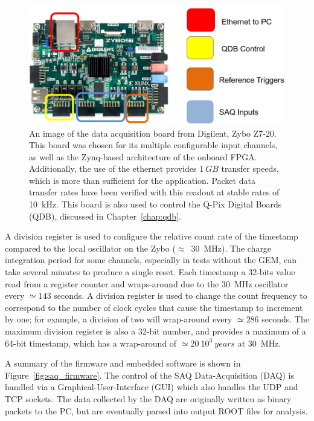 \begin{figure}[]
\centering
\includegraphics[width=\textwidth]{images/saq_zybo_io_summary.png}
\caption{An image of the data acquisition board from Digilent, Zybo Z7-20. 
This board was chosen for its multiple configurable input channels, as well as the Zynq-based architecture of the onboard FPGA.
Additionally, the use of the ethernet provides $1~\unit{GB}$ transfer speeds, which is more than sufficient for the application.
Packet data transfer rates have been verified with this readout at stable rates of 10~\unit{kHz}.
This board is also used to control the Q-Pix Digital Boards (QDB), discussed in Chapter~\ref{chap:qdb}.
}
\label{fig:saq_zybo}
\end{figure}

A division register is used to configure the relative count rate of the timestamp compared to the local oscillator on the Zybo ($\approx$~30~\unit{MHz}).
The charge integration period for some channels, especially in tests without the GEM, can take several minutes to produce a single reset.
Each timestamp a 32-bits value read from a register counter and wraps-around due to the 30~\unit{MHz} oscillator every $\simeq 143$ seconds.
A division register is used to change the count frequency to correspond to the number of clock cycles that cause the timestamp to increment by one; for example, a division of two will wrap-around every $\simeq 286$ seconds.
The maximum division register is also a 32-bit number, and provides a maximum of a 64-bit timestamp, which has a wrap-around of $\simeq 20~10^3 ~\unit{years}$ at 30~\unit{MHz}.

A summary of the firmware and embedded software is shown in Figure~\ref{fig:saq_firmware}.
The control of the SAQ Data-Acquisition (DAQ) is handled via a Graphical-User-Interface (GUI) which also handles the UDP and TCP sockets.
The data collected by the DAQ are originally written as binary packets to the PC, but are eventually parsed into output ROOT files for analysis.

